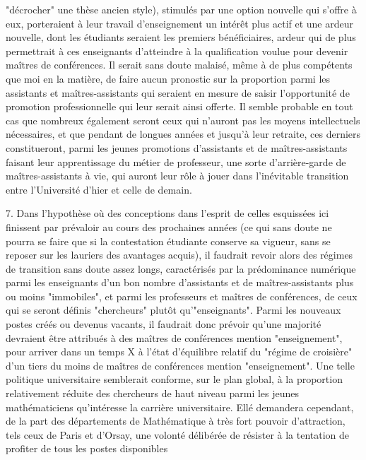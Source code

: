 \documentclass[11pt,a4paper]{article}
\begin{document}

"décrocher" une thèse ancien style), stimulés par une option nouvelle qui s'offre à eux, porteraient à leur travail d'enseignement un intérêt plus actif et une ardeur nouvelle, dont les étudiants seraient les premiers bénéficiaires, ardeur qui de plus permettrait à ces enseignants d'atteindre à la qualification voulue pour devenir maîtres de conférences. Il serait sans doute malaisé, même à de plus compétents que moi en la matière, de faire aucun pronostic sur la proportion parmi les assistants et maîtres-assistants qui seraient en mesure de saisir l'opportunité de promotion professionnelle qui leur serait ainsi offerte. Il semble probable en tout cas que nombreux également seront ceux qui n'auront pas les moyens intellectuels nécessaires, et que pendant de longues années et jusqu'à leur retraite, ces derniers constitueront, parmi les jeunes promotions d'assistants et de maîtres-assistants faisant leur apprentissage du métier de professeur, une sorte d'arrière-garde de maîtres-assistants à vie, qui auront leur rôle à jouer dans l'inévitable transition entre l'Université d'hier et celle de demain.

7. Dans l'hypothèse où des conceptions dans l'esprit de celles esquissées ici finissent par prévaloir au cours des prochaines années (ce qui sans doute ne pourra se faire que si la contestation étudiante conserve sa vigueur, sans se reposer sur les lauriers des avantages acquis), il faudrait revoir alors des régimes de transition sans doute assez longs, caractérisés par la prédominance numérique parmi les enseignants d'un bon nombre d'assistants et de maîtres-assistants plus ou moins "immobiles", et parmi les professeurs et maîtres de conférences, de ceux qui se seront définis "chercheurs" plutôt qu'"enseignants". Parmi les nouveaux postes créés ou devenus vacants, il faudrait donc prévoir qu'une majorité devraient être attribués à des maîtres de conférences mention "enseignement", pour arriver dans un temps X à l'état d'équilibre relatif du "régime de croisière" d'un tiers du moins de maîtres de conférences mention "enseignement". Une telle politique universitaire semblerait conforme, sur le plan global, à la proportion relativement réduite des chercheurs de haut niveau parmi les jeunes mathématiciens qu'intéresse la carrière universitaire. Ellé demandera cependant, de la part des départements de Mathématique à très fort pouvoir d'attraction, tels ceux de Paris et d'Orsay, une volonté délibérée de résister à la tentation de profiter de tous les postes disponibles
\end{document}
